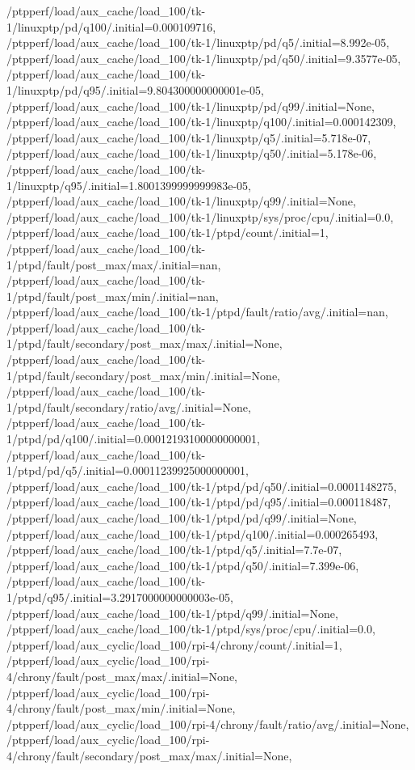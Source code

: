 {    /ptpperf/load/aux_cache/load_100/tk-1/linuxptp/pd/q100/.initial=0.000109716,
    /ptpperf/load/aux_cache/load_100/tk-1/linuxptp/pd/q5/.initial=8.992e-05,
    /ptpperf/load/aux_cache/load_100/tk-1/linuxptp/pd/q50/.initial=9.3577e-05,
    /ptpperf/load/aux_cache/load_100/tk-1/linuxptp/pd/q95/.initial=9.804300000000001e-05,
    /ptpperf/load/aux_cache/load_100/tk-1/linuxptp/pd/q99/.initial=None,
    /ptpperf/load/aux_cache/load_100/tk-1/linuxptp/q100/.initial=0.000142309,
    /ptpperf/load/aux_cache/load_100/tk-1/linuxptp/q5/.initial=5.718e-07,
    /ptpperf/load/aux_cache/load_100/tk-1/linuxptp/q50/.initial=5.178e-06,
    /ptpperf/load/aux_cache/load_100/tk-1/linuxptp/q95/.initial=1.8001399999999983e-05,
    /ptpperf/load/aux_cache/load_100/tk-1/linuxptp/q99/.initial=None,
    /ptpperf/load/aux_cache/load_100/tk-1/linuxptp/sys/proc/cpu/.initial=0.0,
    /ptpperf/load/aux_cache/load_100/tk-1/ptpd/count/.initial=1,
    /ptpperf/load/aux_cache/load_100/tk-1/ptpd/fault/post_max/max/.initial=nan,
    /ptpperf/load/aux_cache/load_100/tk-1/ptpd/fault/post_max/min/.initial=nan,
    /ptpperf/load/aux_cache/load_100/tk-1/ptpd/fault/ratio/avg/.initial=nan,
    /ptpperf/load/aux_cache/load_100/tk-1/ptpd/fault/secondary/post_max/max/.initial=None,
    /ptpperf/load/aux_cache/load_100/tk-1/ptpd/fault/secondary/post_max/min/.initial=None,
    /ptpperf/load/aux_cache/load_100/tk-1/ptpd/fault/secondary/ratio/avg/.initial=None,
    /ptpperf/load/aux_cache/load_100/tk-1/ptpd/pd/q100/.initial=0.00012193100000000001,
    /ptpperf/load/aux_cache/load_100/tk-1/ptpd/pd/q5/.initial=0.00011239925000000001,
    /ptpperf/load/aux_cache/load_100/tk-1/ptpd/pd/q50/.initial=0.0001148275,
    /ptpperf/load/aux_cache/load_100/tk-1/ptpd/pd/q95/.initial=0.000118487,
    /ptpperf/load/aux_cache/load_100/tk-1/ptpd/pd/q99/.initial=None,
    /ptpperf/load/aux_cache/load_100/tk-1/ptpd/q100/.initial=0.000265493,
    /ptpperf/load/aux_cache/load_100/tk-1/ptpd/q5/.initial=7.7e-07,
    /ptpperf/load/aux_cache/load_100/tk-1/ptpd/q50/.initial=7.399e-06,
    /ptpperf/load/aux_cache/load_100/tk-1/ptpd/q95/.initial=3.2917000000000003e-05,
    /ptpperf/load/aux_cache/load_100/tk-1/ptpd/q99/.initial=None,
    /ptpperf/load/aux_cache/load_100/tk-1/ptpd/sys/proc/cpu/.initial=0.0,
    /ptpperf/load/aux_cyclic/load_100/rpi-4/chrony/count/.initial=1,
    /ptpperf/load/aux_cyclic/load_100/rpi-4/chrony/fault/post_max/max/.initial=None,
    /ptpperf/load/aux_cyclic/load_100/rpi-4/chrony/fault/post_max/min/.initial=None,
    /ptpperf/load/aux_cyclic/load_100/rpi-4/chrony/fault/ratio/avg/.initial=None,
    /ptpperf/load/aux_cyclic/load_100/rpi-4/chrony/fault/secondary/post_max/max/.initial=None,
}
